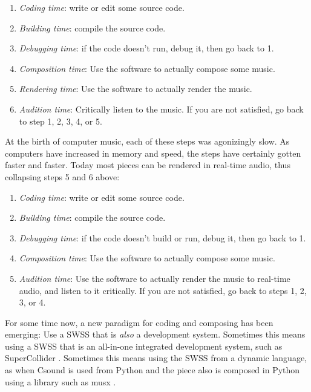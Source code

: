 \documentclass[letterpaper, 12pt]{article}
\begin{document}
\begin{enumerate}
\item \textit{Coding time}: write or edit some source code.
\item \textit{Building time}: compile the source code.
\item \textit{Debugging time}: if the code doesn't run, debug it, then go back to 1.
\item \textit{Composition time}: Use the software to actually compose some music.
\item \textit{Rendering time}: Use the software to actually render the music.
\item \textit{Audition time}: Critically listen to the music. If you are not satisfied, go back to step 1, 2, 3, 4, or 5.
\end{enumerate}

\noindent At the birth of computer music, each of these steps was agonizingly slow. As computers have increased in memory and speed, the steps have certainly gotten faster and faster. Today most pieces can be rendered in real-time audio, thus collapsing steps 5 and 6 above:

\begin{enumerate}
\item \textit{Coding time}: write or edit some source code.
\item \textit{Building time}: compile the source code.
\item \textit{Debugging time}: if the code doesn't build or run, debug it, then go back to 1.
\item \textit{Composition time}: Use the software to actually compose some music.
\item \textit{Audition time}: Use the software to actually render the music to real-time audio, and listen to it critically. If you are not satisfied, go back to steps 1, 2, 3, or 4.
\end{enumerate}

For some time now, a new paradigm for coding and composing has been emerging: Use a SWSS that is \textit{also} a development system. Sometimes this means using a SWSS that is an all-in-one integrated development system, such as SuperCollider \citep{supercollider, mccartney2002rethinking}. Sometimes this means using the SWSS from a dynamic language, as when Csound \citep{csoundmain, lazzarini2016csound, csoundbook} is used from Python \citep{python} and the piece also is composed in Python using a library such as musx \citep{musx}.
\end{document}
